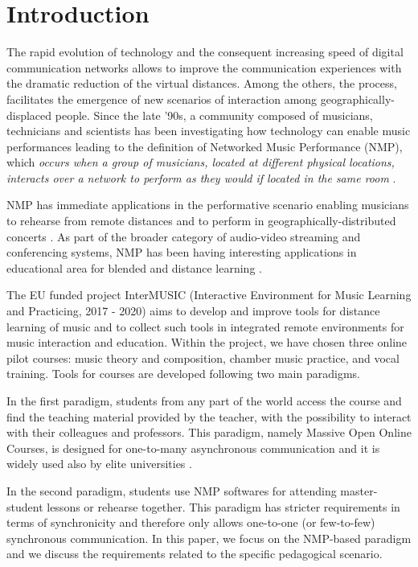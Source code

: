
\section{Introduction}\label{sec:introduction}

The rapid evolution of technology and the consequent increasing speed of digital communication networks allows to improve the communication experiences with the dramatic reduction of the virtual distances. Among the others, the process, facilitates the emergence of new scenarios of interaction among geogra\-phically-displaced people. Since the late '90s, a community composed of musicians, technicians and scientists has been investigating how technology can enable music performances leading to the definition of Networked Music Performance (NMP), which \textit{occurs when a group of musicians, located at different physical locations, interacts over a network to perform as they would if located in the same room} \cite{Lazzaro2001}.

NMP has immediate applications in the performative scenario enabling musicians to rehearse from remote distances and to perform in geographically-distributed concerts \cite{barbosa2003displaced}. As part of the broader category of audio-video streaming and conferencing systems, NMP has been having interesting applications in educational area for blended and distance learning \cite{IorwerthNMP2015}.    


The EU funded project InterMUSIC%
(Interactive Environment for Music Learning and Practicing, 2017 - 2020) aims to develop and improve tools for distance learning of music and to collect such tools in integrated remote environments for music interaction and education. Within the project, we have chosen three online pilot courses: music theory and composition, chamber music practice, and vocal training. Tools for courses are developed following two main paradigms. %

In the first paradigm, students from any part of the world access the course and find the teaching material provided by the teacher, with the possibility to interact with their colleagues and professors. This paradigm, namely Massive Open Online Courses, is designed for one-to-many asynchronous communication and it is widely used also by elite universities \cite{MOOCS}.

In the second paradigm, students use NMP softwares for attending master-student lessons or rehearse together. This paradigm has stricter requirements in terms of synchronicity and therefore only allows one-to-one (or few-to-few) synchronous communication. In this paper, we focus on the NMP-based paradigm and we discuss the  requirements related to the specific pedagogical scenario.

